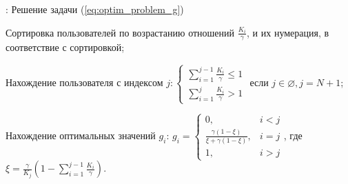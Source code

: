 \begin{algorithm}
  \caption{: Решение задачи (\ref{eq:optim_problem_g})}
	\label{alg:GTheoremAlgorithm}
  \begin{algorithmic}[1]
	 \item Сортировка пользователей по возрастанию отношений $\frac{K_i}{\gamma}$, и их нумерация, в соответствие с сортировкой;
	 \item Нахождение пользователя с индексом $j:\begin{cases}
		\sum\limits_{i=1}^{j-1} {\frac{K_i}{\gamma}} \leq 1 \\
		\sum\limits_{i=1}^{j} {\frac{K_i}{\gamma}} > 1
		\end{cases}$
		\newline
		если $j\in\varnothing, j=N+1$;
	\item Нахождение оптимальных значений $g_i$: \newline
	$g_i=\begin{cases}
		0, & i < j \\
		\frac{\gamma (1 - \xi)}{\xi + \gamma (1-\xi)}, & i=j \\
		1, & i > j
		\end{cases}$,\newline
		где $\xi = \frac{\gamma}{K_j}\left(1 - \sum\limits_{i=1}^{j-1} {\frac{K_i}{\gamma}}\right)$.
  \end{algorithmic}
\end{algorithm}

